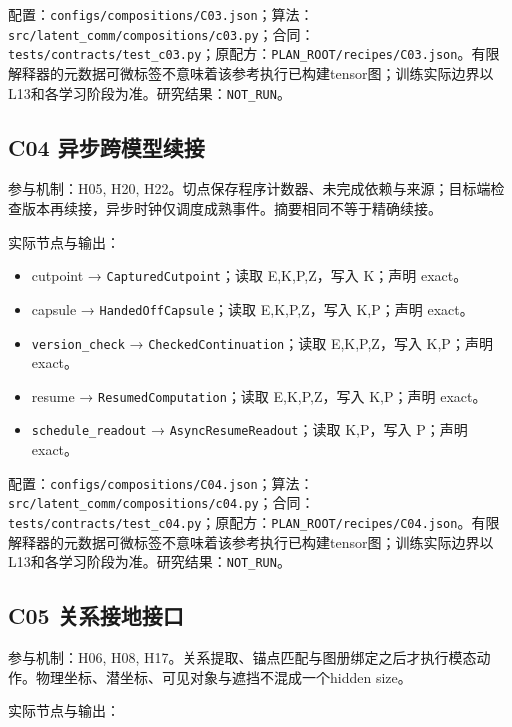 \documentclass[
  10pt,
]{article}
\begin{document}
配置：{\small\nolinkurl{configs/compositions/C03.json}}；算法：{\small\nolinkurl{src/latent_comm/compositions/c03.py}}；合同：{\small\nolinkurl{tests/contracts/test_c03.py}}；原配方：{\small\nolinkurl{PLAN_ROOT/recipes/C03.json}}。有限解释器的元数据可微标签不意味着该参考执行已构建tensor图；训练实际边界以L13和各学习阶段为准。研究结果：\nolinkurl{NOT_RUN}。

\subsection{C04
异步跨模型续接}\label{c04-ux5f02ux6b65ux8de8ux6a21ux578bux7eedux63a5}

参与机制：H05, H20,
H22。切点保存程序计数器、未完成依赖与来源；目标端检查版本再续接，异步时钟仅调度成熟事件。摘要相同不等于精确续接。

实际节点与输出：

\begin{itemize}
\item
  cutpoint → \nolinkurl{CapturedCutpoint}；读取 E,K,P,Z，写入 K；声明
  exact。
\item
  capsule → \nolinkurl{HandedOffCapsule}；读取 E,K,P,Z，写入 K,P；声明
  exact。
\item
  \nolinkurl{version_check} → \nolinkurl{CheckedContinuation}；读取
  E,K,P,Z，写入 K,P；声明 exact。
\item
  resume → \nolinkurl{ResumedComputation}；读取 E,K,P,Z，写入 K,P；声明
  exact。
\item
  \nolinkurl{schedule_readout} → \nolinkurl{AsyncResumeReadout}；读取
  K,P，写入 P；声明 exact。
\end{itemize}

配置：{\small\nolinkurl{configs/compositions/C04.json}}；算法：{\small\nolinkurl{src/latent_comm/compositions/c04.py}}；合同：{\small\nolinkurl{tests/contracts/test_c04.py}}；原配方：{\small\nolinkurl{PLAN_ROOT/recipes/C04.json}}。有限解释器的元数据可微标签不意味着该参考执行已构建tensor图；训练实际边界以L13和各学习阶段为准。研究结果：\nolinkurl{NOT_RUN}。

\subsection{C05
关系接地接口}\label{c05-ux5173ux7cfbux63a5ux5730ux63a5ux53e3}

参与机制：H06, H08,
H17。关系提取、锚点匹配与图册绑定之后才执行模态动作。物理坐标、潜坐标、可见对象与遮挡不混成一个hidden
size。

实际节点与输出：
\end{document}
